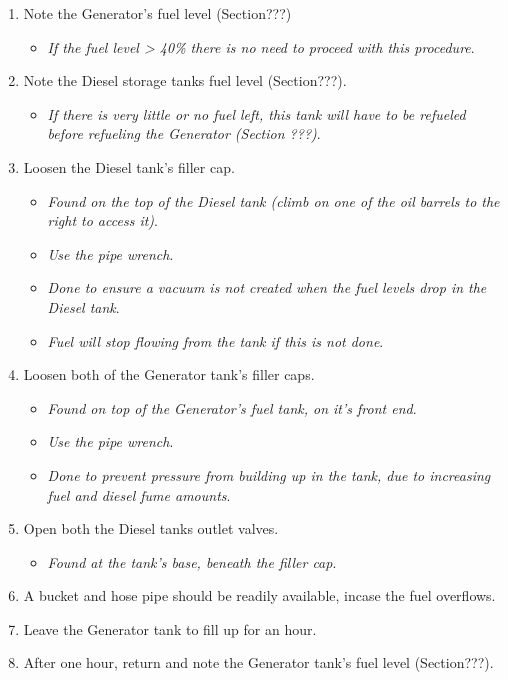 \documentclass[
  12pt,
]{report}
\providecommand{\tightlist}{%
  \setlength{\itemsep}{0pt}\setlength{\parskip}{0pt}}\usepackage{longtable,booktabs,array}
\begin{document}
\begin{enumerate}
\def\labelenumi{\arabic{enumi}.}
\setcounter{enumi}{14}
\tightlist
\item
  Note the Generator's fuel level (Section???)

  \begin{itemize}
  \tightlist
  \item
    \emph{If the fuel level \textgreater{} 40\% there is no need to
    proceed with this procedure}.
  \end{itemize}
\item
  Note the Diesel storage tanks fuel level (Section???).

  \begin{itemize}
  \tightlist
  \item
    \emph{If there is very little or no fuel left, this tank will have
    to be refueled before refueling the Generator (Section ???)}.
  \end{itemize}
\item
  Loosen the Diesel tank's filler cap.

  \begin{itemize}
  \tightlist
  \item
    \emph{Found on the top of the Diesel tank (climb on one of the oil
    barrels to the right to access it)}.
  \item
    \emph{Use the pipe wrench}.
  \item
    \emph{Done to ensure a vacuum is not created when the fuel levels
    drop in the Diesel tank}.
  \item
    \emph{Fuel will stop flowing from the tank if this is not done}.
  \end{itemize}
\item
  Loosen both of the Generator tank's filler caps.

  \begin{itemize}
  \tightlist
  \item
    \emph{Found on top of the Generator's fuel tank, on it's front end}.
  \item
    \emph{Use the pipe wrench}.
  \item
    \emph{Done to prevent pressure from building up in the tank, due to
    increasing fuel and diesel fume amounts}.
  \end{itemize}
\item
  Open both the Diesel tanks outlet valves.

  \begin{itemize}
  \tightlist
  \item
    \emph{Found at the tank's base, beneath the filler cap}.
  \end{itemize}
\item
  A bucket and hose pipe should be readily available, incase the fuel
  overflows.
\item
  Leave the Generator tank to fill up for an hour.
\item
  After one hour, return and note the Generator tank's fuel level
  (Section???).


\end{enumerate}
\end{document}
